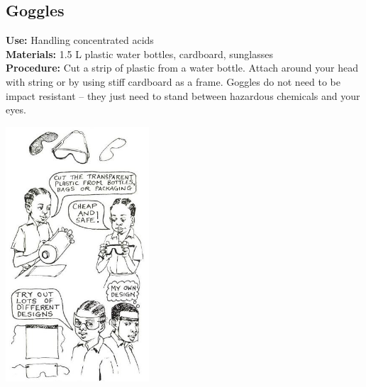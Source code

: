 \begin{multicols}{2}
\section{Goggles} 
\label{sec:goggles}
\vspace{-10pt}
\textbf{Use:} Handling concentrated acids\\
\textbf{Materials:} 1.5 L plastic water bottles, cardboard, sunglasses\\
\textbf{Procedure:} Cut a strip of plastic from a water bottle. Attach around your head with string or by using stiff cardboard as a frame. Goggles do not need to be impact resistant -- they just need to stand between hazardous chemicals and your eyes. 
\begin{center}
\includegraphics[width=0.4\textwidth]{./img/source/goggles.jpg}
\end{center}


\end{multicols}
